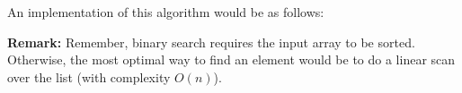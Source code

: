 \documentclass[14pt]{extarticle}
\begin{document}
    An implementation of this algorithm would be as follows:
    \begin{algorithm}
    \end{algorithm}

    \textbf{Remark:} Remember, binary search requires the input array to be
    sorted. Otherwise, the most optimal way to find an element would be to
    do a linear scan over the list (with complexity $O(n)$).
\end{document}
